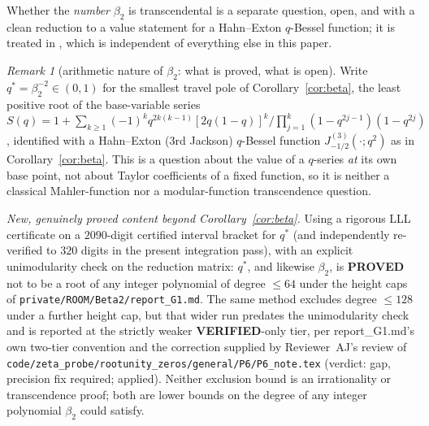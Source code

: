 \documentclass[11pt]{article}
\theoremstyle{plain}
\theoremstyle{definition}
\theoremstyle{remark}
\newtheorem{remark}[theorem]{Remark}
\theoremstyle{plain}\newtheorem*{maintheorem}{Main Theorem}
\begin{document}
Whether the \emph{number} $\beta_2$ is transcendental is a separate question, open, and with a
clean reduction to a value statement for a Hahn--Exton $q$-Bessel function; it is treated in
{\cite[Appendix \textup{app:beta2}]{Bonfioli2026bB}}, which is independent of everything else in this paper.

\begin{remark}[arithmetic nature of $\beta_2$: what is proved, what is open]\label{rem:beta2arith}
Write $q^\ast=\beta_2^{-2}\in(0,1)$ for the smallest travel pole of Corollary~\ref{cor:beta}, the
least positive root of the base-variable series
$S(q)=1+\sum_{k\ge1}(-1)^k q^{2k(k-1)}[2q(1-q)]^k/\prod_{j=1}^k(1-q^{2j-1})(1-q^{2j})$, identified
with a Hahn--Exton (3rd Jackson) $q$-Bessel function $J^{(3)}_{-1/2}(\cdot;q^2)$ as in
Corollary~\ref{cor:beta}. This is a question about the value of a $q$-series \emph{at} its own
base point, not about Taylor coefficients of a fixed function, so it is neither a classical
Mahler-function nor a modular-function transcendence question.

\emph{New, genuinely proved content beyond Corollary~\ref{cor:beta}.} Using a rigorous LLL
certificate on a $2090$-digit certified interval bracket for $q^\ast$ (and independently
re-verified to $320$ digits in the present integration pass), with an explicit unimodularity
check on the reduction matrix: $q^\ast$, and likewise $\beta_2$, is \textbf{PROVED} not to be a
root of any integer polynomial of degree $\le64$ under the height caps of
\texttt{private/ROOM/Beta2/report\_G1.md}. The same method excludes degree $\le128$
under a further height cap, but that wider run predates the unimodularity check and is reported
at the strictly weaker \textbf{VERIFIED}-only tier, per report\_G1.md's own two-tier convention
and the correction supplied by Reviewer~AJ's review of
\texttt{code/zeta\_probe/rootunity\_zeros/general/P6/P6\_note.tex}
(verdict: gap, precision fix required; applied). Neither exclusion bound is an irrationality or
transcendence proof; both are lower bounds on the degree of any integer polynomial $\beta_2$
could satisfy.


\end{remark}
\end{document}
